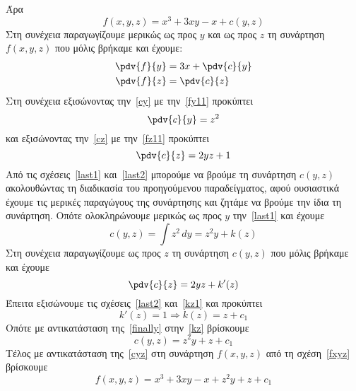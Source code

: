 \begin{solution}
\begin{description}
          Άρα 
          \begin{equation}
            f(x,y,z) =  x^{3} + 3xy -x + c(y,z) \label{fxyz}
          \end{equation}
          Στη συνέχεια παραγωγίζουμε μερικώς ως προς $y$ και ως προς $z$  
          τη συνάρτηση $f(x,y,z)$ που μόλις βρήκαμε και έχουμε:
          \begin{align}
            \pdv{f}{y} &= 3x + \pdv{c}{y} \label{cy} \\
            \pdv{f}{z} &= \pdv{c}{z} \label{cz}
          \end{align}
          Στη συνέχεια εξισώνοντας την~\eqref{cy} με την~\eqref{fy11} προκύπτει 
          \begin{equation}
            \pdv{c}{y} = z^{2} \label{last1}
          \end{equation}
          και εξισώνοντας την~\eqref{cz} με την~\eqref{fz11} προκύπτει
          \begin{equation}
            \pdv{c}{z} = 2yz+1 \label{last2}
          \end{equation}
          Από τις σχέσεις~\eqref{last1} και~\eqref{last2} μπορούμε να βρούμε τη συνάρτηση 
          $ c(y,z) $ ακολουθώντας τη διαδικασία του προηγούμενου παραδείγματος, αφού 
          ουσιαστικά έχουμε τις μερικές παραγώγους της συνάρτησης και ζητάμε 
          να βρούμε την ίδια τη συνάρτηση. Οπότε ολοκληρώνουμε μερικώς ως προς 
          $y$ την~\eqref{last1} και έχουμε
          \begin{equation}
            c(y,z) = \int z^{2} \,{dy} = z^{2}y + k(z) \label{kz} 
          \end{equation} 
          Στη συνέχεια παραγωγίζουμε ως προς $z$ τη συνάρτηση $ c(y,z) $ που μόλις βρήκαμε 
          και έχουμε
          \begin{equation}
            \pdv{c}{z} = 2yz + k'(z) \label{kz1}
          \end{equation} 
          Έπειτα εξισώνουμε τις σχέσεις~\eqref{last2} και~\eqref{kz1} και προκύπτει 
          \[
            k'(z) = 1 \Rightarrow k(z) = z + c_{1} \label{finally}
          \] 
          Οπότε με αντικατάσταση της~\eqref{finally} στην~\eqref{kz} βρίσκουμε 
          \begin{equation}
            c(y,z) = z^{2}y+z + c_{1} \label{cyz}
          \end{equation}
          Τέλος με αντικατάσταση της~\eqref{cyz} στη συνάρτηση $ f(x,y,z) $ από τη 
          σχέση~\eqref{fxyz} βρίσκουμε
          \[
            f(x,y,z) = x^{3}+3xy-x+z^{2}y+z+ c_{1} 
          \] 
      \end{description}
    \end{solution}

